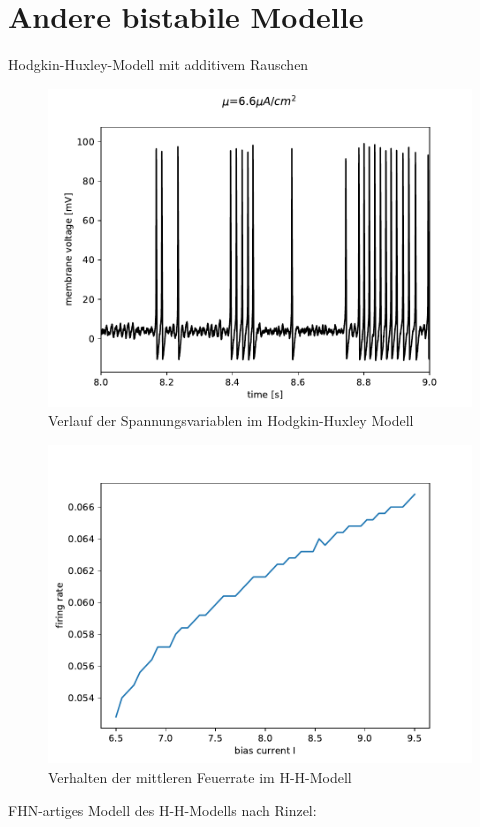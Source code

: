\documentclass[12pt,a4paper]{article}
\begin{document}
\section{Andere bistabile Modelle}
Hodgkin-Huxley-Modell mit additivem Rauschen
\begin{figure}[H]
	\centering
	\includegraphics[scale=1]{realstatehhkurz.pdf}\caption{Verlauf der Spannungsvariablen im Hodgkin-Huxley Modell}
	\label{hhvolt}
\end{figure}
\begin{figure}[H]
	\centering
	\includegraphics[scale=1]{detmocounthh.pdf}\caption{Verhalten der mittleren Feuerrate im H-H-Modell}
	\label{hhcount}
\end{figure}
FHN-artiges Modell des H-H-Modells nach Rinzel:
\end{document}
